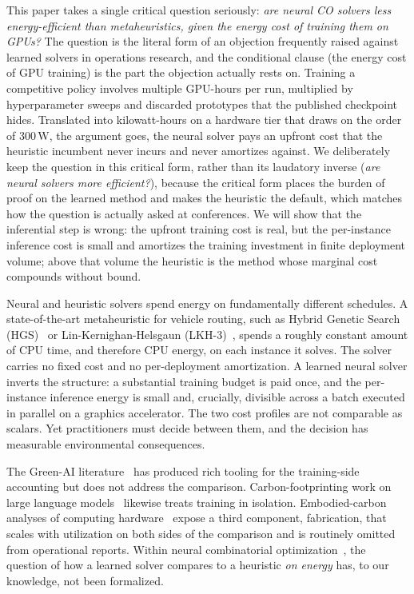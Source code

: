 \documentclass[11pt]{article}
\begin{document}
This paper takes a single critical question seriously: \emph{are neural CO solvers less energy-efficient than metaheuristics, given the energy cost of training them on GPUs?} The question is the literal form of an objection frequently raised against learned solvers in operations research, and the conditional clause (the energy cost of GPU training) is the part the objection actually rests on. Training a competitive policy involves multiple GPU-hours per run, multiplied by hyperparameter sweeps and discarded prototypes that the published checkpoint hides. Translated into kilowatt-hours on a hardware tier that draws on the order of \(300\,\mathrm{W}\), the argument goes, the neural solver pays an upfront cost that the heuristic incumbent never incurs and never amortizes against. We deliberately keep the question in this critical form, rather than its laudatory inverse (\emph{are neural solvers more efficient?}), because the critical form places the burden of proof on the learned method and makes the heuristic the default, which matches how the question is actually asked at conferences. We will show that the inferential step is wrong: the upfront training cost is real, but the per-instance inference cost is small and amortizes the training investment in finite deployment volume; above that volume the heuristic is the method whose marginal cost compounds without bound.

Neural and heuristic solvers spend energy on fundamentally different schedules. A state-of-the-art metaheuristic for vehicle routing, such as Hybrid Genetic Search (HGS)~\cite{vidal2012hgs,vidal2022hgs} or Lin-Kernighan-Helsgaun (LKH-3)~\cite{helsgaun2017lkh}, spends a roughly constant amount of CPU time, and therefore CPU energy, on each instance it solves. The solver carries no fixed cost and no per-deployment amortization. A learned neural solver inverts the structure: a substantial training budget is paid once, and the per-instance inference energy is small and, crucially, divisible across a batch executed in parallel on a graphics accelerator. The two cost profiles are not comparable as scalars. Yet practitioners must decide between them, and the decision has measurable environmental consequences.

The Green-AI literature~\cite{strubell2019energy,schwartz2020green,henderson2020systematic} has produced rich tooling for the training-side accounting but does not address the comparison. Carbon-footprinting work on large language models~\cite{patterson2021carbon,luccioni2023bloom} likewise treats training in isolation. Embodied-carbon analyses of computing hardware~\cite{gupta2021chasing,wu2022sustainable} expose a third component, fabrication, that scales with utilization on both sides of the comparison and is routinely omitted from operational reports. Within neural combinatorial optimization~\cite{vinyals2015pointer,bello2017neural,kool2019attention,kwon2020pomo,berto2024rl4co}, the question of how a learned solver compares to a heuristic \emph{on energy} has, to our knowledge, not been formalized.
\end{document}
